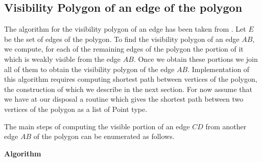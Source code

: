 \documentclass[a4paper,10pt]{article}
\begin{document}
\newcommand{\jttstylea}{\color[rgb]{1.00,1.00,1.00}} %
\newcommand{\jttstyleb}{\color[rgb]{.501,.501,.501}} %
\newcommand{\jttstylec}{\color[rgb]{.247,.498,.372}} %
\newcommand{\jttstyled}{\color[rgb]{.247,.498,.372}} %
\newcommand{\jttstylee}{\color[rgb]{.498,.000,.333}} %
\newcommand{\jttstylef}{\color[rgb]{.164,.000,1.00}} %
\newcommand{\jttstyleg}{\color[rgb]{.600,.000,.000}} %
\newcommand{\jttstyleh}{\color[rgb]{.600,.000,.000}} %
\newcommand{\jttstylei}{\color[rgb]{.000,.000,.000}} %
\newcommand{\jttstylej}{\color[rgb]{.498,.000,.333}} %
\newcommand{\jttstylek}{\color[rgb]{.000,.000,.000}} %
\newcommand{\jttstylel}{\color[rgb]{.498,.623,.749}} %
\newcommand{\jttstylem}{\color[rgb]{.498,.498,.623}} %
\newcommand{\jttstylen}{\color[rgb]{.247,.247,.749}} %
\newcommand{\jttstyleo}{\color[rgb]{.247,.372,.749}} %
\newcommand{\jttstylep}{\color[rgb]{1.00,.380,.000}} %
\newcommand{\jttstyleq}{\color[rgb]{.392,.392,.392}} %




\subsection{Visibility Polygon of an edge of the polygon}
The algorithm for the visibility polygon of an edge has been taken from \cite{key3}.
Let $E$ be the set of edges of the polygon. To find the visibility polygon of an edge $AB$, we compute, for each of 
 the remaining edges of the polygon the portion of it which is weakly visible from the edge $AB$. Once we obtain these portions we join
 all of them to obtain the visibility polygon of the edge $AB$.
  Implementation of this algorithm requires computing shortest path between vertices of the polygon, the construction of which we 
describe in the next section. For now assume that we have at our disposal a routine which gives the shortest path between two vertices 
of the polygon as a list of Point type.

The main steps of computing the visible portion of an edge $CD$ from another edge $AB$ of the polygon can be enumerated as follows.

{\bf Algorithm}
\end{document}
